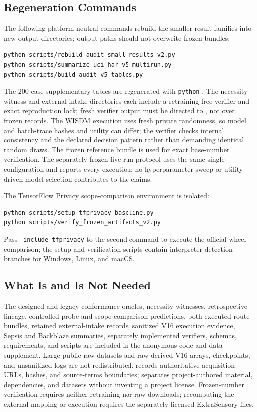 \documentclass[letterpaper]{article} %
\begin{document}
\subsection{Regeneration Commands}

The following platform-neutral commands rebuild the smaller result families
into new output directories; output paths should not overwrite frozen bundles:
\begingroup
\scriptsize
\begin{verbatim}
python scripts/rebuild_audit_small_results_v2.py
python scripts/summarize_uci_har_v5_multirun.py
python scripts/build_audit_v5_tables.py
\end{verbatim}
\endgroup
The 200-case supplementary tables are regenerated with \texttt{python}
.
The necessity-witness and external-intake directories each include a
retraining-free verifier and exact reproduction lock; fresh verifier output
must be directed to , not over frozen records.
The WISDM execution uses fresh private randomness, so model and batch-trace
hashes and utility can differ; the verifier checks internal consistency and
the declared decision pattern rather than demanding identical random draws.
The frozen reference bundle is used for exact base-number verification.
The separately frozen five-run protocol uses the same single configuration
and reports every execution; no hyperparameter sweep or utility-driven model
selection contributes to the claims.

The TensorFlow Privacy scope-comparison environment is isolated:
\begingroup
\scriptsize
\begin{verbatim}
python scripts/setup_tfprivacy_baseline.py
python scripts/verify_frozen_artifacts_v2.py
\end{verbatim}
\endgroup
Pass \texttt{--include-tfprivacy} to the second command to execute the official
wheel comparison; the setup and verification scripts contain interpreter
detection branches for Windows, Linux, and macOS.

\subsection{What Is and Is Not Needed}

The designed and legacy conformance oracles, necessity witnesses,
retrospective lineage, controlled-probe and scope-comparison predictions, both
executed route bundles, retained external-intake records, sanitized V16
execution evidence, Sepsis and Backblaze summaries, separately implemented
verifiers, schemas, requirements, and scripts are included in the anonymous code-and-data
supplement.  Large public raw datasets and raw-derived V16 arrays, checkpoints,
and unsanitized logs are not redistributed.  
records authoritative acquisition URLs, hashes, and source-terms boundaries;
 separates project-authored material, dependencies, and
datasets without inventing a project license.  Frozen-number verification
requires neither retraining nor raw downloads; recomputing the external
mapping or execution requires the separately licensed ExtraSensory files.
\end{document}
